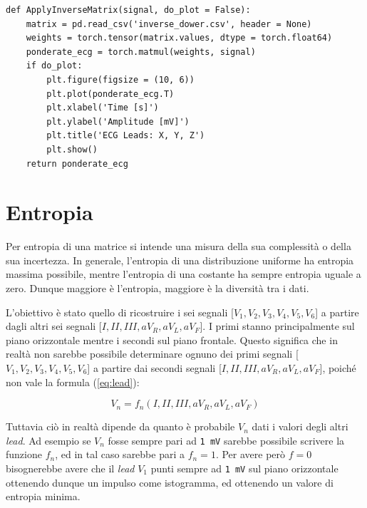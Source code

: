 \documentclass[12pt,italian]{report}
\begin{document}
\lstset{language=Python}
\begin{lstlisting}[aboveskip=15pt, belowskip=15pt, basicstyle=\fontsize{8}{10}\selectfont, keywordstyle=\color{blue}, breaklines=true, label=snippet:dower]
def ApplyInverseMatrix(signal, do_plot = False):
    matrix = pd.read_csv('inverse_dower.csv', header = None)
    weights = torch.tensor(matrix.values, dtype = torch.float64)
    ponderate_ecg = torch.matmul(weights, signal)
    if do_plot:
        plt.figure(figsize = (10, 6))
        plt.plot(ponderate_ecg.T)
        plt.xlabel('Time [s]')
        plt.ylabel('Amplitude [mV]')
        plt.title('ECG Leads: X, Y, Z')
        plt.show()
    return ponderate_ecg
\end{lstlisting}

\section{Entropia}
\label{sec:entropia}

Per entropia di una matrice si intende una misura della sua complessità o della sua incertezza. In generale, l’entropia di una distribuzione uniforme ha entropia massima possibile, mentre l'entropia di una costante ha sempre entropia uguale a zero. Dunque maggiore è l’entropia, maggiore è la diversità tra i dati.

L'obiettivo è stato quello di ricostruire i sei segnali [$ V_{1}, V_{2}, V_{3}, V_{4}, V_{5}, V_{6} $] a partire dagli altri sei segnali [$ I, II, III, aV_{R}, aV_{L}, aV_{F} $]. I primi stanno principalmente sul piano orizzontale mentre i secondi sul piano frontale. Questo significa che in realtà non sarebbe possibile determinare ognuno dei primi segnali [$ V_{1}, V_{2}, V_{3}, V_{4}, V_{5}, V_{6} $] a partire dai secondi segnali [$ I, II, III, aV_{R}, aV_{L}, aV_{F} $], poiché non vale la formula (\ref{eq:lead}):

\begin{equation}
    V_{n} = f_{n}(I, II, III, aV_{R}, aV_{L}, aV_{F})
    \label{eq:lead}
\end{equation}

Tuttavia ciò in realtà dipende da quanto è probabile $ V_{n} $ dati i valori degli altri \textit{lead}. Ad esempio se $ V_{n} $ fosse sempre pari ad \texttt{1 mV} sarebbe possibile scrivere la funzione $ f_{n} $, ed in tal caso sarebbe pari a $ f_{n} = 1 $. Per avere però $ f = 0 $ bisognerebbe avere che il \textit{lead} $ V_{1} $ punti sempre ad \texttt{1 mV} sul piano orizzontale ottenendo dunque un impulso come istogramma, ed ottenendo un valore di entropia minima.
\end{document}
